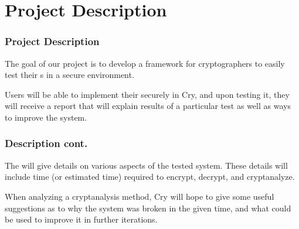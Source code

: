 \section{Project Description}


\begin{frame}
\frametitle{Project Description}
  \item The goal of our project is to develop a framework for
cryptographers to easily test their \cs s in a
secure environment.
  \item Users will be able to implement their
\cs{} securely in Cry, and upon testing it, they will
receive a report that will explain results of a particular
test as well as ways to improve the system.
\end{frame}

\begin{frame}
\frametitle{Description cont.}
  \item The will give details on various aspects of the tested system.
These details will include time (or estimated time) required
to encrypt, decrypt, and cryptanalyze.
  \item When analyzing a
cryptanalysis method, Cry will hope to give some useful
suggestions as to why the system was broken in the given
time, and what could be used to improve it in further
iterations.
\end{frame}

